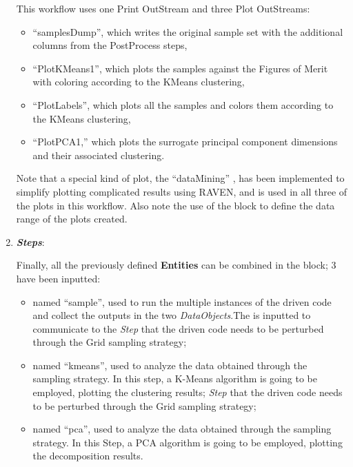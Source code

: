 \begin{enumerate}
     This workflow uses one Print OutStream and three Plot OutStreams:
     \begin{itemize}
       \item ``samplesDump'', which writes the original sample set with the additional columns from the
         PostProcess steps,
       \item ``PlotKMeans1'', which plots the samples against the Figures of Merit with coloring according to
         the KMeans clustering,
       \item ``PlotLabels'', which plots all the samples and colors them according to the KMeans clustering,
       \item ``PlotPCA1,'' which plots the surrogate principal component dimensions and their associated clustering.
     \end{itemize}
     Note that a special kind of plot, the ``dataMining'' , has been implemented to simplify
     plotting complicated results using RAVEN, and is used in all three of the plots in this workflow.  Also
     note the use of the  block to define the data range of the plots created.
   \item \textbf{\textit{Steps}}:

   Finally, all the previously defined \textbf{Entities} can be combined in
   the  block;
   3  have been inputted:
   \begin{itemize}
     \item {} named ``sample'', used to run the
     multiple
     instances of the driven code and
     collect the outputs in the two \textit{DataObjects}.The  is inputted to communicate to the
     \textit{Step} that the driven code needs to
     be perturbed through the Grid sampling strategy;
     \item {} named ``kmeans'', used
     to analyze the data obtained through the sampling strategy. In
     this step, a K-Means algorithm is going to be employed, plotting
     the clustering results;
     \textit{Step} that the driven code needs to
     be perturbed through the Grid sampling strategy;
     \item {} named ``pca'', used
     to analyze the data obtained through the sampling strategy. In
     this Step, a PCA algorithm is going to be employed, plotting
     the decomposition results.
   \end{itemize}
\end{enumerate}
